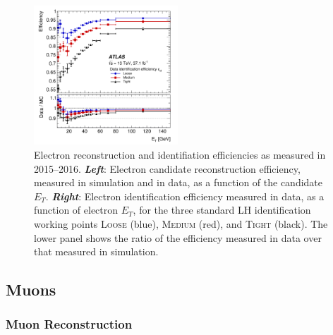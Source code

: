 \begin{figure}[!htb]
    \begin{center}
        \includegraphics[width=0.48\textwidth]{figures/chapter3/egamma/egamma_id_eff_Et}
        \caption{
            Electron reconstruction and identifiation efficiencies as measured in 2015--2016.
            \textbf{\textit{Left}}: Electron candidate reconstruction efficiency, measured in simulation and in data, as
                a function of the candidate $E_T$.
            \textbf{\textit{Right}}: Electron identification efficiency measured in data, as a function of electron $E_T$,
                for the three standard LH identification working points \textsc{Loose} (blue), \textsc{Medium} (red), and \textsc{Tight} (black).
                The lower panel shows the ratio of the efficiency measured in data over that measured in simulation.
        }
        \label{fig:egamma_eff_Et}
    \end{center}
\end{figure}

\subsection{Muons}
\label{sec:muons}

\subsubsection{Muon Reconstruction}
\label{sec:muon_reco}

